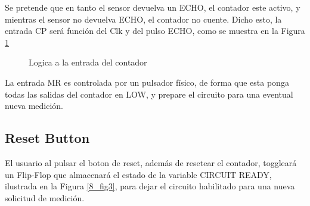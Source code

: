 Se pretende que en tanto el sensor devuelva un ECHO, el contador este activo, y mientras el sensor no devuelva ECHO, el contador no cuente. Dicho esto, la entrada CP será función del Clk y del pulso ECHO, como se muestra en la Figura \ref{8_fig6}

\begin{figure}[H]
\centering

\caption{Logica a la entrada del contador} \label{8_fig6}
\end{figure}

La entrada MR es controlada por un pulsador físico, de forma que esta ponga todas las salidas del contador en LOW, y prepare el circuito para una eventual nueva medición.

\subsection*{Reset Button}

El usuario al pulsar el boton de reset, además de resetear el contador, toggleará un Flip-Flop que almacenará el estado de la variable CIRCUIT READY, ilustrada en la Figura \ref{8_fig3}, para dejar el circuito habilitado para una nueva solicitud de medición.